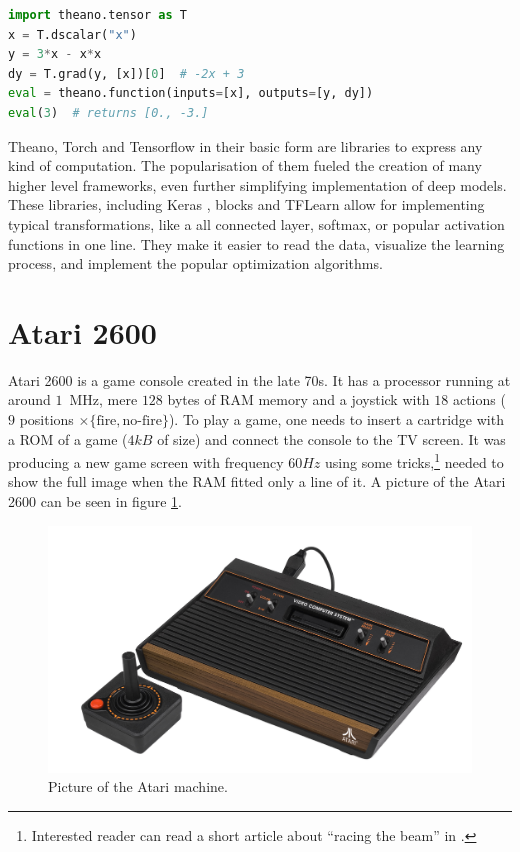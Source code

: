 \begin{lstlisting}[language=Python, caption=Example Theano code.,label={theano-code}
]
import theano.tensor as T
x = T.dscalar("x")
y = 3*x - x*x
dy = T.grad(y, [x])[0]  # -2x + 3
eval = theano.function(inputs=[x], outputs=[y, dy])
eval(3)  # returns [0., -3.]
\end{lstlisting}

Theano, Torch and Tensorflow in their basic form are libraries to express any kind of computation. The popularisation of them fueled the creation of many higher level frameworks, even further simplifying implementation of deep models. These libraries, including Keras \cite{keras}, blocks \cite{blocks} and TFLearn \cite{tflearn} allow for implementing typical transformations, like a all connected layer, softmax, or popular activation functions in one line. They make it easier to read the data, visualize the learning process, and implement the popular optimization algorithms.

\section{Atari 2600}
Atari 2600 is a game console created in the late 70s. It has a processor running at around $1$~MHz, mere $128$ bytes of RAM memory and a joystick with $18$ actions ($9$ positions $\times \{\mbox{fire}, \mbox{no-fire}\}$). To play a game, one needs to insert a cartridge with a ROM of a game ($4kB$ of size) and connect the console to the TV screen. It was producing a new game screen with frequency $60Hz$ using some tricks,\footnote{Interested reader can read a short article about ``racing the beam'' in \cite{racing-beam}.} needed to show the full image when the RAM fitted only a line of it. A picture of the Atari 2600 can be seen in figure \ref{atari-picture}.

\begin{figure}
  \centering
  \includegraphics[width=.8\linewidth]{images/atari.jpg}
  \caption{Picture of the Atari machine.}\label{atari-picture}
\end{figure}

